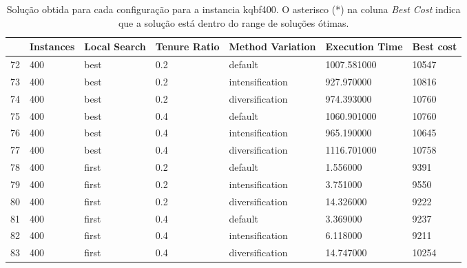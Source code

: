 \begin{table}
\centering
\begin{tabular}{lllllll}
\toprule
{} & Instances & Local Search & Tenure Ratio & Method Variation & Execution Time & Best cost \\
\midrule
72 &       400 &         best &          0.2 &          default &  1007.581000 &     10547 \\
73 &       400 &         best &          0.2 &  intensification &   927.970000 &     10816 \\
74 &       400 &         best &          0.2 &  diversification &   974.393000 &     10760 \\
75 &       400 &         best &          0.4 &          default &  1060.901000 &     10760 \\
76 &       400 &         best &          0.4 &  intensification &   965.190000 &     10645 \\
77 &       400 &         best &          0.4 &  diversification &  1116.701000 &     10758 \\
78 &       400 &        first &          0.2 &          default &     1.556000 &      9391 \\
79 &       400 &        first &          0.2 &  intensification &     3.751000 &      9550 \\
80 &       400 &        first &          0.2 &  diversification &    14.326000 &      9222 \\
81 &       400 &        first &          0.4 &          default &     3.369000 &      9237 \\
82 &       400 &        first &          0.4 &  intensification &     6.118000 &      9211 \\
83 &       400 &        first &          0.4 &  diversification &    14.747000 &     10254 \\
\bottomrule
\end{tabular}
\caption{Solução obtida para cada configuração para a instancia kqbf400. O asterisco (*) na coluna \textit{Best Cost} indica que a solução está dentro do range de soluções ótimas.}
\label{table:all-data-6}
\end{table}

